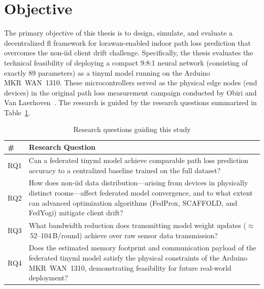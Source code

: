 \section{Objective}
\label{sec:objective}
The primary objective of this thesis is to design, simulate, and evaluate a decentralized \gls{fl} framework for \gls{lorawan}-enabled indoor path loss prediction that overcomes the non-\gls{iid} client drift challenge. Specifically, the thesis evaluates the technical feasibility of deploying a compact 9:8:1 neural network (consisting of exactly 89 parameters) as a \gls{tinyml} model running on the Arduino MKR~WAN~1310. These microcontrollers served as the physical edge nodes (end devices) in the original path loss measurement campaign conducted by Obiri and Van Laerhoven~\cite{obiri2026environment,obiri2025comprehensive}. The research is guided by the research questions summarized in Table~\ref{tab:research-questions}.

\begin{table}[htbp]
\centering
\caption{Research questions guiding this study}
\label{tab:research-questions}
\begin{tabularx}{\textwidth}{lX}
\toprule
\textbf{\#} & \textbf{Research Question} \\
\midrule
RQ1 & Can a federated \gls{tinyml} model achieve comparable path loss prediction accuracy to a centralized baseline trained on the full dataset? \\
\addlinespace
RQ2 & How does non-\gls{iid} data distribution---arising from devices in physically distinct rooms---affect federated model convergence, and to what extent can advanced optimization algorithms (FedProx, SCAFFOLD, and FedYogi) mitigate client drift? \\
\addlinespace
RQ3 & What bandwidth reduction does transmitting model weight updates ($\approx$\,52--104\,B/round) achieve over raw sensor data transmission? \\
\addlinespace
RQ4 & Does the estimated memory footprint and communication payload of the federated \gls{tinyml} model satisfy the physical constraints of the Arduino MKR~WAN~1310, demonstrating feasibility for future real-world deployment? \\
\bottomrule
\end{tabularx}
\end{table}
